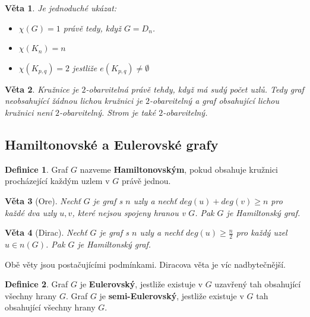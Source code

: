 \documentclass[a4]{report}
\newtheorem{theorem}{Věta}
\theoremstyle{definition}
\newtheorem{definition}{Definice}[section]
\begin{document}
\begin{theorem}
Je jednoduché ukázat:
\begin{itemize}
    \item $\chi(G)=1$ právě tedy, když $G=D_n$.
    \item $\chi(K_n)=n$
    \item $\chi(K_{p,q})=2$ jestliže $e(K_{p,q}) \ne \emptyset$
\end{itemize}
\end{theorem}

\begin{theorem}
Kružnice je $2$-obarvitelná právě tehdy, když má sudý počet uzlů. Tedy graf neobsahující žádnou lichou kružnici je $2$-obarvitelný a graf obsahující lichou kružnici není $2$-obarvitelný. Strom je také $2$-obarvitelný.
\end{theorem}

\subsection{Hamiltonovské a Eulerovské grafy}

\begin{definition}
Graf $G$ nazveme \textbf{Hamiltonovským}, pokud obsahuje kružnici procházející každým uzlem v $G$ právě jednou.
\end{definition}

\begin{theorem}[Ore]
Nechť $G$ je graf s $n$ uzly a nechť $deg(u) + deg(v) \geq n$ pro každé dva uzly $u,v$, které nejsou spojeny hranou v $G$. Pak $G$ je Hamiltonský graf.
\end{theorem}

\begin{theorem}[Dirac]
Nechť $G$ je graf s $n$ uzly a nechť $deg(u) \geq \frac{n}{2}$ pro každý uzel $u \in n(G)$. Pak $G$ je Hamiltonský graf.
\end{theorem}

Obě věty jsou postačujícími podmínkami. Diracova věta je víc nadbytečnější.

\begin{definition}
Graf $G$ je \textbf{Eulerovský}, jestliže existuje v $G$ uzavřený tah obsahující všechny hrany $G$. Graf $G$ je \textbf{semi-Eulerovský}, jestliže existuje v $G$ tah obsahující všechny hrany $G$.
\end{definition}
\end{document}
